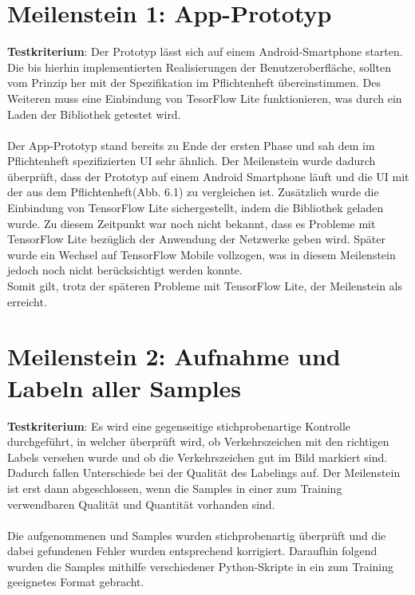 \documentclass[12pt,a4paper,ngerman,enabledeprecatedfontcommands]{scrreprt}
\begin{document}
\section{Meilenstein 1: App-Prototyp}
\textbf{Testkriterium}: Der Prototyp lässt sich auf einem Android-Smartphone starten. Die bis hierhin implementierten Realisierungen der Benutzeroberfläche, sollten vom Prinzip her mit der Spezifikation im Pflichtenheft übereinstimmen. Des Weiteren muss eine Einbindung von TesorFlow Lite funktionieren, was durch ein Laden der Bibliothek getestet wird.\\
\\
Der App-Prototyp stand bereits zu Ende der ersten Phase und sah dem im Pflichtenheft spezifizierten \gls{UI} sehr ähnlich. Der Meilenstein wurde dadurch überprüft, dass der Prototyp auf einem Android Smartphone läuft und die \gls{UI} mit der aus dem Pflichtenheft(Abb. 6.1) zu vergleichen ist. Zusätzlich wurde die Einbindung von TensorFlow Lite sichergestellt, indem die Bibliothek geladen wurde.
Zu diesem Zeitpunkt war noch nicht bekannt, dass es Probleme mit TensorFlow Lite bezüglich der Anwendung der Netzwerke geben wird. Später wurde ein Wechsel auf TensorFlow Mobile vollzogen, was in diesem Meilenstein jedoch noch nicht berücksichtigt werden konnte.\\
Somit gilt, trotz der späteren Probleme mit TensorFlow Lite, der Meilenstein als erreicht.\\

\section{Meilenstein 2: Aufnahme und Labeln aller Samples}
\textbf{Testkriterium}: Es wird eine gegenseitige stichprobenartige Kontrolle durchgeführt, in welcher überprüft wird, ob Verkehrszeichen mit den richtigen Labels versehen wurde und ob die Verkehrszeichen gut im Bild markiert sind. Dadurch fallen Unterschiede bei der Qualität des Labelings auf. Der Meilenstein ist erst dann abgeschlossen, wenn die Samples in einer zum Training verwendbaren Qualität und Quantität vorhanden sind.\\ 
\\
Die aufgenommenen und  \gls{Sample}s wurden stichprobenartig überprüft und die dabei gefundenen Fehler wurden entsprechend korrigiert. Daraufhin folgend wurden die Samples mithilfe verschiedener Python-Skripte in ein zum Training geeignetes Format gebracht.\\
\end{document}
